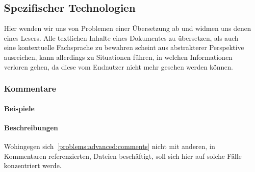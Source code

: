 



\subsection{Spezifischer Technologien}\label{problems:special}%
Hier wenden wir uns von Problemen einer Übersetzung ab und widmen uns denen eines Lesers. Alle textlichen Inhalte eines Dokumentes zu übersetzen, als auch eine kontextuelle Fachsprache zu bewahren scheint aus abstrakterer Perspektive ausreichen, kann allerdings zu Situationen führen, in welchen Informationen verloren gehen, da diese vom Endnutzer nicht mehr gesehen werden können.%



\subsubsection{Kommentare}\label{problems:advanced:comments}
\paragraph*{Beispiele}
\paragraph*{Beschreibungen}
Wohingegen sich~\ref{problems:advanced:comments} nicht mit anderen, in Kommentaren referenzierten, Dateien beschäftigt, soll sich hier auf solche Fälle konzentriert werde.
